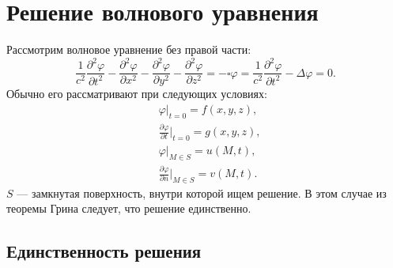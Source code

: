 \documentclass[a4paper,14pt]{extreport} %
\newcommand{\dff}[2]{\frac{\partial #1}{\partial #2}}
\newcommand{\dfs}[2]{\frac{\partial^2 #1}{\partial #2^2}}
\begin{document}
	\section{Решение волнового уравнения}
	Рассмотрим волновое уравнение без правой части:
	\begin{equation*}
	\frac{1}{c^2}\dfs{\varphi}{t} - \dfs{\varphi}{x} - \dfs{\varphi}{y} - \dfs{\varphi}{z} = -\square \varphi = \frac{1}{c^2}\dfs{\varphi}{t} - \Delta\varphi = 0.
	\end{equation*}
	Обычно его рассматривают при следующих условиях:
	\begin{align*}
	&\varphi\Big|_{t = 0} = f(x, y, z),\\
	&\dff{\varphi}{t} \Big|_{t = 0} = g(x, y, z),\\
	&\varphi \Big|_{M\in S} = u(M, t), \\
	&\dff{\varphi}{n} \Big|_{M\in S} = v(M, t).
	\end{align*}
	$S$ --- замкнутая поверхность, внутри которой ищем решение. В этом случае из теоремы Грина следует, что решение единственно.
	
	\subsection{Единственность решения}
	
\end{document}
